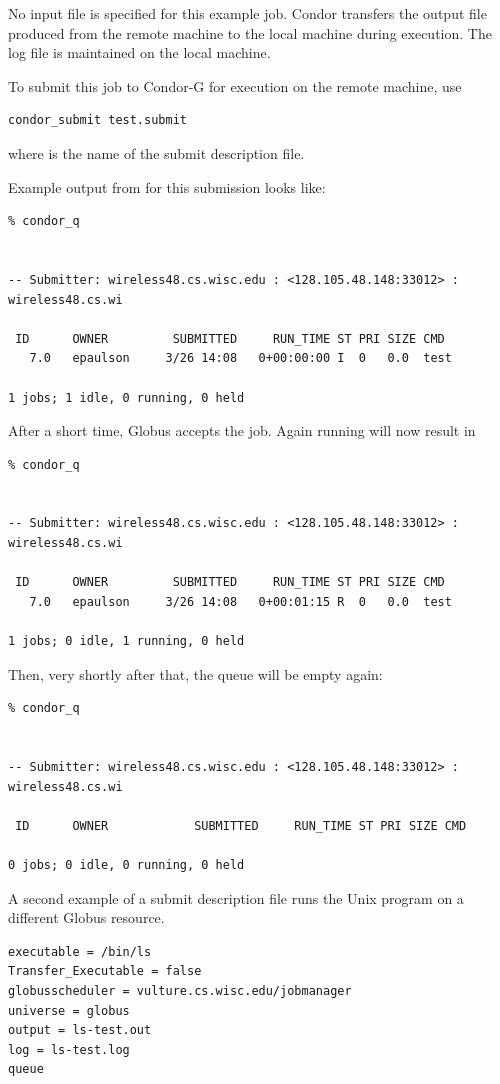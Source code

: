 No input file is specified for this example job.
Condor transfers the output file produced 
from the remote machine to the local machine during execution.
The log file is maintained on the local machine.

To submit this job to Condor-G for execution on the
remote machine, use
\begin{verbatim}
condor_submit test.submit
\end{verbatim}
where  is the name of the submit description file.

Example output from 
 for this submission looks like:
\begin{verbatim}
% condor_q


-- Submitter: wireless48.cs.wisc.edu : <128.105.48.148:33012> : wireless48.cs.wi

 ID      OWNER         SUBMITTED     RUN_TIME ST PRI SIZE CMD
   7.0   epaulson     3/26 14:08   0+00:00:00 I  0   0.0  test

1 jobs; 1 idle, 0 running, 0 held
\end{verbatim}

After a short time, Globus accepts the job.
Again running  will now result in

\begin{verbatim}
% condor_q


-- Submitter: wireless48.cs.wisc.edu : <128.105.48.148:33012> : wireless48.cs.wi

 ID      OWNER         SUBMITTED     RUN_TIME ST PRI SIZE CMD
   7.0   epaulson     3/26 14:08   0+00:01:15 R  0   0.0  test

1 jobs; 0 idle, 1 running, 0 held
\end{verbatim}

Then, very shortly after that, the queue will be empty again:

\begin{verbatim}
% condor_q


-- Submitter: wireless48.cs.wisc.edu : <128.105.48.148:33012> : wireless48.cs.wi

 ID      OWNER            SUBMITTED     RUN_TIME ST PRI SIZE CMD

0 jobs; 0 idle, 0 running, 0 held
\end{verbatim}


A second example of a submit description file runs the Unix 
program on a different Globus resource.

\begin{verbatim}
executable = /bin/ls
Transfer_Executable = false
globusscheduler = vulture.cs.wisc.edu/jobmanager
universe = globus
output = ls-test.out
log = ls-test.log
queue
\end{verbatim} 

